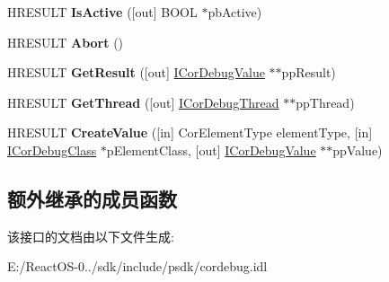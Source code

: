 \begin{DoxyCompactItemize}
H\+R\+E\+S\+U\+LT {\bfseries Is\+Active} (\mbox{[}out\mbox{]} B\+O\+OL $\ast$pb\+Active)
\item 
\mbox{\label{interface_i_cor_debug_eval_aa0c76922bd02de64a7a46324c2e4cf49}} 
H\+R\+E\+S\+U\+LT {\bfseries Abort} ()
\item 
\mbox{\label{interface_i_cor_debug_eval_a85ce88085060b878e8e4b1bf8e3909d9}} 
H\+R\+E\+S\+U\+LT {\bfseries Get\+Result} (\mbox{[}out\mbox{]} \hyperlink{interface_i_cor_debug_value}{I\+Cor\+Debug\+Value} $\ast$$\ast$pp\+Result)
\item 
\mbox{\label{interface_i_cor_debug_eval_a251c05ea9c8ccce01083c879a7785bea}} 
H\+R\+E\+S\+U\+LT {\bfseries Get\+Thread} (\mbox{[}out\mbox{]} \hyperlink{interface_i_cor_debug_thread}{I\+Cor\+Debug\+Thread} $\ast$$\ast$pp\+Thread)
\item 
\mbox{\label{interface_i_cor_debug_eval_af3ca656279801d62c235fa97ac5ba827}} 
H\+R\+E\+S\+U\+LT {\bfseries Create\+Value} (\mbox{[}in\mbox{]} Cor\+Element\+Type element\+Type, \mbox{[}in\mbox{]} \hyperlink{interface_i_cor_debug_class}{I\+Cor\+Debug\+Class} $\ast$p\+Element\+Class, \mbox{[}out\mbox{]} \hyperlink{interface_i_cor_debug_value}{I\+Cor\+Debug\+Value} $\ast$$\ast$pp\+Value)
\end{DoxyCompactItemize}
\subsection*{额外继承的成员函数}


该接口的文档由以下文件生成\+:\begin{DoxyCompactItemize}
\item 
E\+:/\+React\+O\+S-\/0../sdk/include/psdk/cordebug.\+idl\end{DoxyCompactItemize}
